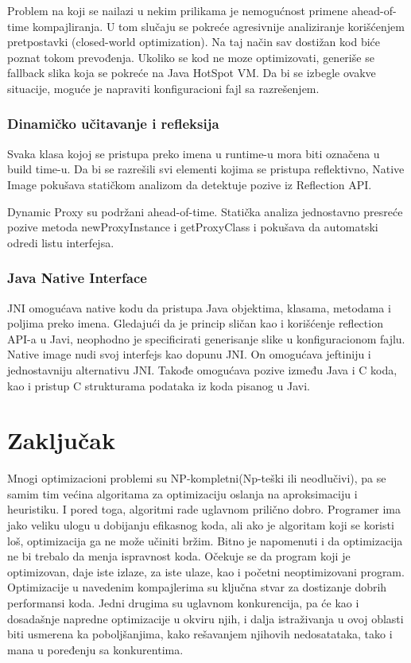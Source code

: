 \documentclass[a4paper]{article}
\begin{document}
Problem na koji se nailazi u nekim prilikama je nemogućnost 
primene ahead-of-time kompajliranja. U tom slučaju se pokreće 
agresivnije analiziranje korišćenjem pretpostavki (closed-world optimization). 
Na taj način sav dostižan kod biće poznat tokom prevođenja.
Ukoliko se kod ne moze optimizovati, generiše se fallback slika
koja se pokreće na Java HotSpot VM. Da bi se izbegle ovakve situacije,
moguće je napraviti konfiguracioni fajl sa razrešenjem.

\subsubsection{Dinamičko učitavanje i refleksija}
\label{sec:natImg-dynRefl}
Svaka klasa kojoj se pristupa preko imena u runtime-u mora 
biti označena u build time-u.
Da bi se razrešili svi elementi kojima se pristupa reflektivno,
Native Image pokušava statičkom analizom da detektuje pozive 
iz Reflection API.

Dynamic Proxy su podržani ahead-of-time. Statička analiza 
jednostavno presreće pozive metoda newProxyInstance i 
getProxyClass i pokušava da automatski odredi listu interfejsa.

\subsubsection{Java Native Interface}
\label{sec:natImg-jni}
JNI omogućava native kodu da pristupa Java objektima, klasama,
metodama i poljima preko imena. Gledajući da je princip sličan
kao i korišćenje reflection API-a u Javi, neophodno je specificirati
generisanje slike u konfiguracionom fajlu.
Native image nudi svoj interfejs kao dopunu JNI.
On omogućava jeftiniju i jednostavniju alternativu JNI. Takođe
omogućava pozive između Java i C koda, kao i pristup C strukturama
podataka iz koda pisanog u Javi.



\section{Zaključak}
\label{sec:zakljucak}

Mnogi optimizacioni problemi su NP-kompletni(Np-teški ili neodlučivi), pa se samim tim većina algoritama za optimizaciju oslanja na aproksimaciju i heuristiku.  
I pored toga, algoritmi rade uglavnom prilično dobro. 
Programer ima jako veliku ulogu u dobijanju efikasnog koda, ali ako je algoritam koji se koristi loš, optimizacija ga ne može učiniti bržim. 
Bitno je napomenuti i da optimizacija ne bi trebalo da menja ispravnost koda. 
Očekuje se da program koji je optimizovan, daje iste izlaze, za iste ulaze, kao i početni neoptimizovani program.
Optimizacije u navedenim kompajlerima su ključna stvar za dostizanje dobrih performansi koda. 
Jedni drugima su uglavnom konkurencija, pa će kao i dosadašnje napredne optimizacije u okviru njih, i dalja istraživanja u ovoj 
oblasti biti usmerena ka poboljšanjima, kako rešavanjem njihovih nedosatataka, tako i mana u poređenju sa konkurentima.


\appendix
 

\end{document}
